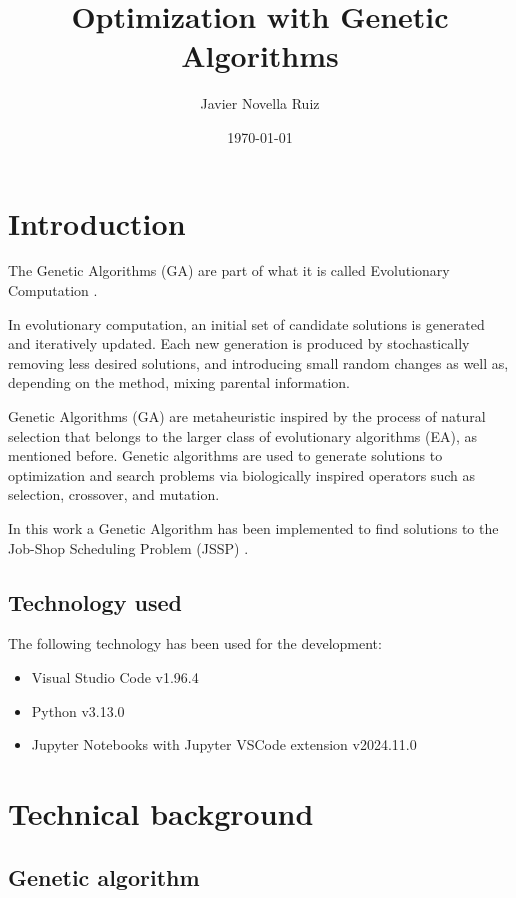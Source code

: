 \documentclass[11pt, a4paper]{article}
\title{Optimization with Genetic Algorithms}
\author{Javier Novella Ruiz}
\date{\today}
\begin{document}


\tableofcontents

\newpage

\section{Introduction}

The Genetic Algorithms (GA) \cite{WikipediaGA} are part of what it is called Evolutionary Computation \cite{WikipediaEC}.

\vspace{1em} In evolutionary computation, an initial set of candidate solutions is generated and iteratively updated. Each 
new generation is produced by stochastically removing less desired solutions, and introducing small random changes as well 
as, depending on the method, mixing parental information.

\vspace{1em} Genetic Algorithms (GA) are metaheuristic inspired by the process of natural selection that belongs to the larger 
class of evolutionary algorithms (EA), as mentioned before. Genetic algorithms are used to generate solutions to optimization 
and search problems via biologically inspired operators such as selection, crossover, and mutation.

\vspace{1em} In this work a Genetic Algorithm has been implemented to find solutions to the Job-Shop Scheduling Problem (JSSP)
\cite{WikipediaJSSP}.

\subsection{Technology used}

The following technology has been used for the development:

\begin{itemize}
    \item Visual Studio Code v1.96.4
    \item Python v3.13.0
    \item Jupyter Notebooks with Jupyter VSCode extension v2024.11.0
\end{itemize}

\section{Technical background}

\subsection{Genetic algorithm}
\end{document}

